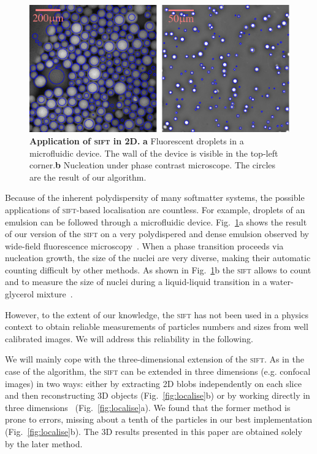 \documentclass[8.5pt,twoside,twocolumn]{article}
\begin{document}
\begin{figure}
	\centering
	\includegraphics{fig_applications.pdf}
	\caption{\textbf{Application of \textsc{sift} in 2D.} \textbf{a} Fluorescent droplets in a microfluidic device. The wall of the device is visible in the top-left corner.\textbf{b} Nucleation under phase contrast microscope. The circles are the result of our algorithm.}
	\label{fig:applications}
\end{figure}

Because of the inherent polydispersity of many softmatter systems, the possible applications of \textsc{sift}-based localisation are countless. For example, droplets of an emulsion can be followed through a microfluidic device. Fig.~\ref{fig:applications}a shows the result of our version of the \textsc{sift} on a very polydispered and dense emulsion observed by wide-field fluorescence microscopy~\cite{Montagne2011}. When a phase transition proceeds via nucleation growth, the size of the nuclei are very diverse, making their automatic counting difficult by other methods. As shown in Fig.~\ref{fig:applications}b the \textsc{sift} allows to count and to measure the size of nuclei during a liquid-liquid transition in a water-glycerol mixture~\cite{Murata2012}.

However, to the extent of our knowledge, the \textsc{sift} has not been used in a physics context to obtain reliable measurements of particles numbers and sizes from well calibrated images. We will address this reliability in the following.

We will mainly cope with the three-dimensional extension of the \textsc{sift}. As in the case of the \citet{Crocker1996} algorithm, the \textsc{sift} can be extended in three dimensions (e.g. confocal images) in two ways: either by extracting 2D blobs independently on each slice and then reconstructing 3D objects (Fig.~\ref{fig:localise}b) or by working directly in three dimensions~\cite{Urschler2006, Cheung2009} (Fig.~\ref{fig:localise}a). We found that the former method is prone to errors, missing about a tenth of the particles in our best implementation (Fig.~\ref{fig:localise}b). The 3D results presented in this paper are obtained solely by the later method.
\end{document}
